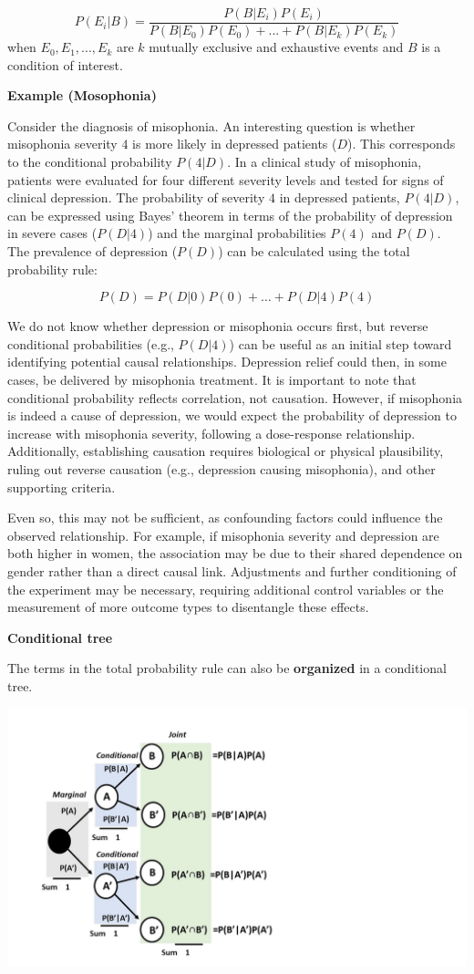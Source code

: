 \documentclass[
]{book}
\begin{document}
\[P(E_i| B)= \frac{P(B|E_i)P(E_i)}{P(B|E_0)P(E_0) +...+ P(B|E_k)P(E_k)}\]
when \(E_0, E_1, ..., E_k\) are \(k\) mutually exclusive and exhaustive events and \(B\) is a condition of interest.

\textbf{Example (Mosophonia)}

Consider the diagnosis of misophonia. An interesting question is whether misophonia severity \(4\) is more likely in depressed patients (\(D\)). This corresponds to the conditional probability \(P(4|D)\). In a clinical study of misophonia, patients were evaluated for four different severity levels and tested for signs of clinical depression. The probability of severity \(4\) in depressed patients, \(P(4|D)\), can be expressed using Bayes' theorem in terms of the probability of depression in severe cases (\(P(D|4)\)) and the marginal probabilities \(P(4)\) and \(P(D)\). The prevalence of depression (\(P(D)\)) can be calculated using the total probability rule:

\[
P(D) = P(D|0)P(0) + \ldots + P(D|4)P(4)
\]

We do not know whether depression or misophonia occurs first, but reverse conditional probabilities (e.g., \(P(D|4)\)) can be useful as an initial step toward identifying potential causal relationships. Depression relief could then, in some cases, be delivered by misophonia treatment. It is important to note that conditional probability reflects correlation, not causation. However, if misophonia is indeed a cause of depression, we would expect the probability of depression to increase with misophonia severity, following a dose-response relationship. Additionally, establishing causation requires biological or physical plausibility, ruling out reverse causation (e.g., depression causing misophonia), and other supporting criteria.

Even so, this may not be sufficient, as confounding factors could influence the observed relationship. For example, if misophonia severity and depression are both higher in women, the association may be due to their shared dependence on gender rather than a direct causal link. Adjustments and further conditioning of the experiment may be necessary, requiring additional control variables or the measurement of more outcome types to disentangle these effects.

\textbf{Conditional tree}

The terms in the total probability rule can also be \textbf{organized} in a conditional tree.

\includegraphics{./figures/treetot.jpg}
\end{document}
